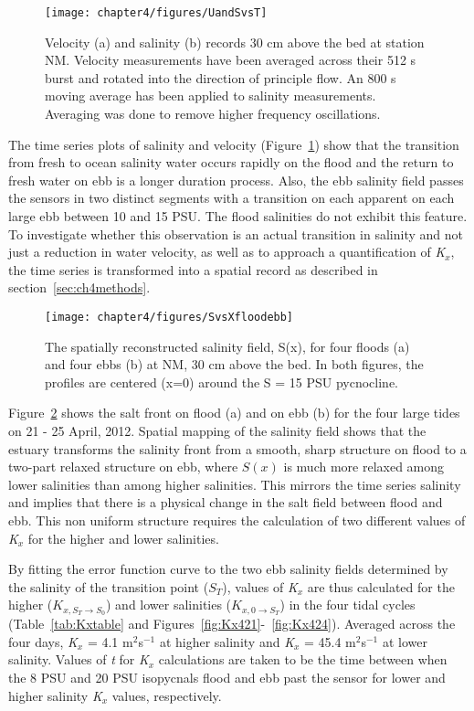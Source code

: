 \begin{figure}[h]
	\texttt{[image: chapter4/figures/UandSvsT]} 
\caption{Velocity (a) and salinity (b) records 30 cm above the bed at station NM. Velocity measurements have been averaged across their 512 s burst and rotated into the direction of principle flow. An 800 s moving average has been applied to salinity measurements. Averaging was done to remove higher frequency oscillations.} \label{fig:UandSvsTch4}
\end{figure}

The time series plots of salinity and velocity (Figure~\ref{fig:UandSvsTch4}) show that the transition from fresh to ocean salinity water occurs rapidly on the flood and the return to fresh water on ebb is a longer duration process. Also, the ebb salinity field passes the sensors in two distinct segments with a transition on each apparent on each large ebb between 10 and 15 PSU. The flood salinities do not exhibit this feature. To investigate whether this observation is an actual transition in salinity and not just a reduction in water velocity, as well as to approach a quantification of \emph{K$_x$}, the time series is transformed into a spatial record as described in section~\ref{sec:ch4methods}. 

\begin{figure}[hp]
	\texttt{[image: chapter4/figures/SvsXfloodebb]} 
\caption{The spatially reconstructed salinity field, S(x), for four floods (a) and four ebbs (b) at NM, 30 cm above the bed. In both figures, the profiles are centered (x=0) around the S = 15 PSU pycnocline.} \label{fig:SvsXall}
\end{figure}

Figure~\ref{fig:SvsXall} shows the salt front on flood (a) and on ebb (b) for the four large tides on 21 - 25 April, 2012. Spatial mapping of the salinity field shows that the estuary transforms  the salinity front from a smooth, sharp structure on flood to a two-part relaxed structure on ebb, where $S(x)$ is much more relaxed among lower salinities than among higher salinities. This mirrors the time series salinity and implies that there is a physical change in the salt field between flood and ebb. This non uniform structure requires the calculation of two different values of \emph{K$_x$} for the higher and lower salinities.

By fitting the error function curve to the two ebb salinity fields determined by the salinity of the transition point ($S_T$), values of \emph{K$_x$} are thus calculated for the higher ($K_{x,S_T\rightarrow S_0}$) and lower salinities ($K_{x,0\rightarrow S_T}$) in the four tidal cycles (Table~\ref{tab:Kxtable} and Figures~\ref{fig:Kx421}-~\ref{fig:Kx424}). Averaged across the four days, \emph{K$_x$} = 4.1 m$^2$s$^{-1}$ at higher salinity and \emph{K$_x$} = 45.4 m$^2$s$^{-1}$ at lower salinity. Values of \emph{t} for \emph{K$_x$} calculations are taken to be the time between when the 8 PSU and 20 PSU isopycnals flood and ebb past the sensor for lower and higher salinity \emph{K$_x$} values, respectively. 


